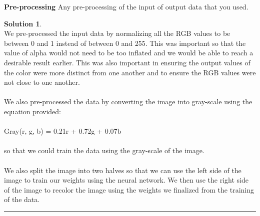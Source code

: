 \documentclass{article}
\theoremstyle{definition}
\def\fline{\rule{0.75\linewidth}{0.5pt}}
\newcommand{\finishline}{\vspace{-15pt}\begin{center}\fline\end{center}}
\newtheorem*{solution*}{Solution}
\newenvironment{solution}{\begin{solution*}}{{\finishline} \end{solution*}}
\begin{document}
    \textbf{Pre-processing}
        Any pre-processing of the input of output data that you used.
        \begin{solution} \hfill \\
        
        We pre-processed the input data by normalizing all the RGB values to be between 0 and 1 instead of between 0 and 255. This was important so that the value of alpha would not need to be too inflated and we would be able to reach a desirable result earlier. This was also important in ensuring the output values of the color were more distinct from one another and to ensure the RGB values were not close to one another.\\\\
        We also pre-processed the data by converting the image into gray-scale using the equation provided: \\\\
        Gray(r, g, b) = 0.21r + 0.72g + 0.07b \\\\
        so that we could train the data using the gray-scale of the image. \\\\
        We also split the image into two halves so that we can use the left side of the image to train our weights using the neural network. We then use the right side of the image to recolor the image using the weights we finalized from the training of the data. 
        \end{solution}\\\\
        
\end{document}
